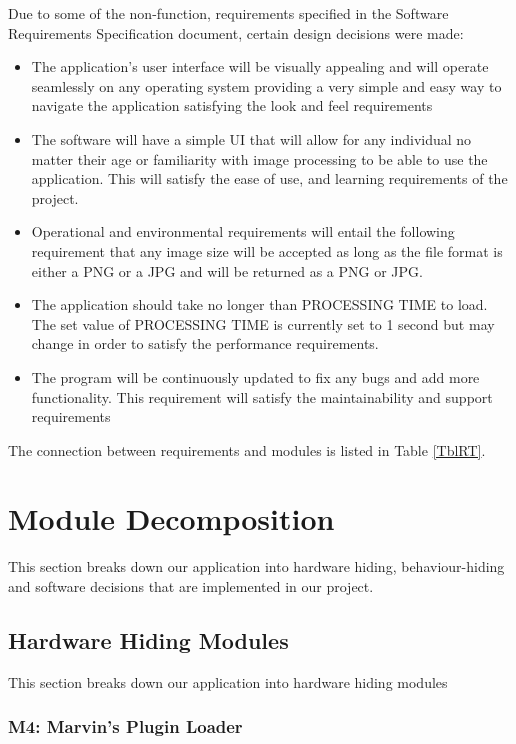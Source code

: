 \documentclass[12pt, titlepage]{article}
\begin{document}
Due to some of the non-function, requirements specified in the Software Requirements Specification document, certain design decisions were made:\\
\begin{itemize}
\item The application’s user interface will be visually appealing and will operate seamlessly on any operating system providing a very simple and easy way to navigate the application satisfying the look and feel requirements\\
\item The software will have a simple UI that will allow for any individual no matter their age or familiarity with image processing to be able to use the application. This will satisfy the ease of use, and learning requirements of the project.
\item Operational and environmental requirements will entail the following requirement that any image size will be accepted as long as the file format is either a PNG or a JPG and will be returned as a PNG or JPG. 
\item The application should take no longer than PROCESSING TIME to load. The set value of PROCESSING TIME is currently set to 1 second but may change in order to satisfy the performance requirements.
\item The program will be continuously updated to fix any bugs and add more functionality. This requirement will satisfy the maintainability and support requirements
\end{itemize}

The connection between requirements and modules is listed in Table \ref{TblRT}.

\section{Module Decomposition} 

This section breaks down our application into hardware hiding, behaviour-hiding and software decisions that are implemented in our project.

\subsection{Hardware Hiding Modules}
This section breaks down our application into hardware hiding modules
\subsubsection{M4: Marvin's Plugin Loader}
\end{document}
